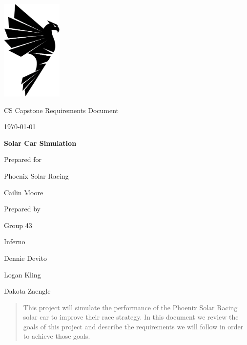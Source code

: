 \documentclass[onecolumn, draftclsnofoot,10pt, compsoc]{IEEEtran}
\def \CapstoneTeamName{		Inferno}
\def \CapstoneTeamNumber{		43}
\def \GroupMemberOne{			Dennie Devito}
\def \GroupMemberTwo{			Logan Kling}
\def \GroupMemberThree{			Dakota Zaengle}
\def \CapstoneProjectName{		Solar Car Simulation}
\def \CapstoneSponsorCompany{	Phoenix Solar Racing}
\def \CapstoneSponsorPerson{		Cailin Moore}
\def \DocType{		%
				Requirements Document
				}
\newcommand{\NameSigPair}[1]{\par
\makebox[2.75in][r]{#1} \hfil 	\makebox[3.25in]{\makebox[2.25in]{\hrulefill} \hfill		\makebox[.75in]{\hrulefill}}
\par\vspace{-12pt} \textit{\tiny\noindent
\makebox[2.75in]{} \hfil		\makebox[3.25in]{\makebox[2.25in][r]{Signature} \hfill	\makebox[.75in][r]{Date}}}}
\renewcommand{\NameSigPair}[1]{#1}
\begin{document}
\begin{singlespace}
\begin{titlepage}
    \begin{singlespace}
        \hfill
        \begin{flushleft}
        \includegraphics[height=5cm]{Shirt_Graphic.png}
        \end{flushleft}
        \par\vspace{.2in}
        \centering
        \scshape{
            \huge CS Capstone \DocType \par
            {\large\today}\par
            \vspace{.5in}
            \textbf{\Huge\CapstoneProjectName}\par
            \vfill
            {\large Prepared for}\par
            \Huge \CapstoneSponsorCompany\par
            \vspace{5pt}
            {\Large\NameSigPair{\CapstoneSponsorPerson}\par}
            {\large Prepared by }\par
            Group\CapstoneTeamNumber\par
            \CapstoneTeamName\par 
            \vspace{5pt}
            {\Large
                \NameSigPair{\GroupMemberOne}\par
                \NameSigPair{\GroupMemberTwo}\par
                \NameSigPair{\GroupMemberThree}\par
            }
            \vspace{20pt}
        }
        \begin{abstract}
        This project will simulate the performance of the Phoenix Solar Racing solar car to improve their race strategy. In this document we review the goals of this project and describe the requirements we will follow in order to achieve those goals. 
        	


\end{abstract}
\end{singlespace}
\end{titlepage}
\end{singlespace}
\end{document}
